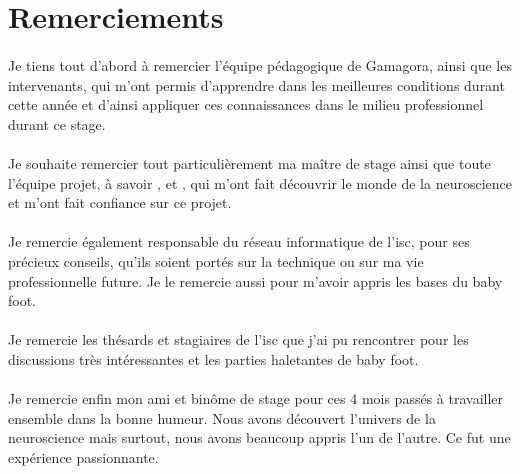 \section*{Remerciements}

\paragraph{}Je tiens tout d'abord à remercier l'équipe pédagogique de Gamagora, ainsi que les intervenants, qui m’ont permis d’apprendre dans les meilleures conditions durant cette
année et d’ainsi appliquer ces connaissances dans le milieu professionnel durant ce stage.

\paragraph{}Je souhaite remercier tout particulièrement ma maître de stage  ainsi que toute l'équipe projet, à savoir , 
et , qui m'ont fait découvrir le monde de la neuroscience et m'ont fait confiance sur ce projet.

\paragraph{}Je remercie également  responsable du réseau informatique de l'\gls{isc}, pour ses précieux conseils, qu'ils soient portés sur la technique ou sur ma vie
professionnelle future. Je le remercie aussi pour m'avoir appris les bases du baby foot.

\paragraph{}Je remercie les thésards et stagiaires de l'\gls{isc} que j'ai pu rencontrer pour les discussions très intéressantes et les parties haletantes de baby foot.

\paragraph{}Je remercie enfin mon ami et binôme de stage  pour ces 4 mois passés à travailler ensemble dans la bonne humeur. Nous avons découvert l'univers de
la neuroscience mais surtout, nous avons beaucoup appris l'un de l'autre. Ce fut une expérience passionnante.

\newpage